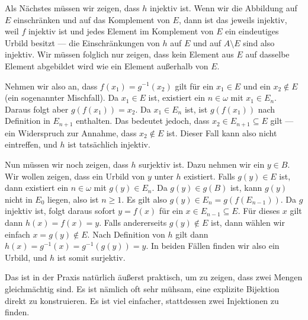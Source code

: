 \begin{spoken-clean}[00:29:10 - 00:30:49]
Als Nächstes müssen wir zeigen, dass $h$ injektiv ist. Wenn wir die Abbildung auf $E$ einschränken und auf das Komplement von $E$, dann ist das jeweils injektiv, weil $f$ injektiv ist und jedes Element im Komplement von $E$ ein eindeutiges Urbild besitzt --- die Einschränkungen von $h$ auf $E$ und auf $A \setminus E$ sind also injektiv. Wir müssen folglich nur zeigen, dass kein Element aus $E$ auf dasselbe Element abgebildet wird wie ein Element außerhalb von $E$.

Nehmen wir also an, dass $f(x_1) = g^{-1}(x_2)$ gilt für ein $x_1 \in E$ und ein $x_2 \notin E$ (ein sogenannter Mischfall). Da $x_1 \in E$ ist, existiert ein $n \in \omega$ mit $x_1 \in E_n$. Daraus folgt aber $g(f(x_1)) = x_2$. Da $x_1 \in E_n$ ist, ist $g(f(x_1))$ nach Definition in $E_{n+1}$ enthalten. Das bedeutet jedoch, dass $x_2 \in E_{n+1} \subseteq E$ gilt --- ein Widerspruch zur Annahme, dass $x_2 \notin E$ ist. Dieser Fall kann also nicht eintreffen, und $h$ ist tatsächlich injektiv.

Nun müssen wir noch zeigen, dass $h$ surjektiv ist. Dazu nehmen wir ein $y \in B$. Wir wollen zeigen, dass ein Urbild von $y$ unter $h$ existiert. Falls $g(y) \in E$ ist, dann existiert ein $n \in \omega$ mit $g(y) \in E_n$. Da $g(y) \in g(B)$ ist, kann $g(y)$ nicht in $E_0$ liegen, also ist $n \ge 1$. Es gilt also $g(y) \in E_n = g(f(E_{n-1}))$. Da $g$ injektiv ist, folgt daraus sofort $y = f(x)$ für ein $x \in E_{n-1} \subseteq E$. Für dieses $x$ gilt dann $h(x) = f(x) = y$. Falls andererseits $g(y) \notin E$ ist, dann wählen wir einfach $x = g(y) \notin E$. Nach Definition von $h$ gilt dann $h(x) = g^{-1}(x) = g^{-1}(g(y)) = y$. In beiden Fällen finden wir also ein Urbild, und $h$ ist somit surjektiv.

Das ist in der Praxis natürlich äußerst praktisch, um zu zeigen, dass zwei Mengen gleichmächtig sind. Es ist nämlich oft sehr mühsam, eine explizite Bijektion direkt zu konstruieren. Es ist viel einfacher, stattdessen zwei Injektionen zu finden.
\end{spoken-clean}

